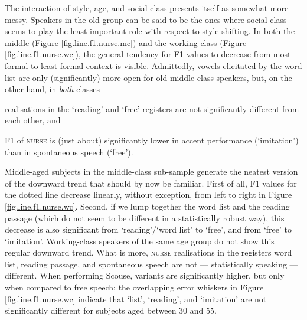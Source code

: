 The interaction of style, age, and social class presents itself as somewhat more messy.
Speakers in the old group can be said to be the ones where social class seems to play the least important role with respect to style shifting.
In both the middle (Figure \ref{fig.line.f1.nurse.mc}) and the working class (Figure \ref{fig.line.f1.nurse.wc}), the general tendency for F1 values to decrease from most formal to least formal context is visible.
Admittedly, vowels elicitated by the word list are only (significantly) more open for old middle-class speakers, but, on the other hand, in \emph{both} classes
\begin{inparaenum}[(a)]
	\item realisations in the `reading' and `free' registers are not significantly different from each other, and
	\item F1 of \textsc{nurse} is (just about) significantly lower in accent performance (`imitation') than in spontaneous speech (`free').
\end{inparaenum}

Middle-aged subjects in the middle-class sub-sample generate the neatest version of the downward trend that should by now be familiar.
First of all, F1 values for the dotted line decrease linearly, without exception, from left to right in Figure \ref{fig.line.f1.nurse.wc}.
Second, if we lump together the word list and the reading passage (which do not seem to be different in a statistically robust way), this decrease is also significant from `reading'/`word list' to `free', and from `free' to `imitation'.
Working-class speakers of the same age group do not show this regular downward trend.
What is more, \textsc{nurse} realisations in the registers word list, reading passage, and spontaneous speech are not --- statistically speaking --- different.
When performing Scouse, variants are significantly higher, but only when compared to free speech; the overlapping error whiskers in Figure \ref{fig.line.f1.nurse.wc} indicate that `list', `reading', and `imitation' are not significantly different for subjects aged between 30 and 55.

